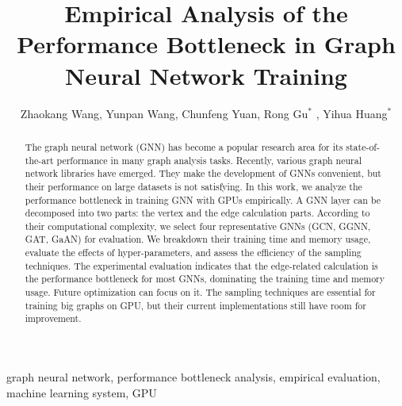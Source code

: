 \documentclass{elsarticle}
\begin{document}
\begin{frontmatter}

	\title{Empirical Analysis of the Performance Bottleneck in Graph Neural Network Training}
    \author{Zhaokang Wang, Yunpan Wang, Chunfeng Yuan, Rong Gu$^*$ , Yihua Huang$^*$ }
	\address{State Key Laboratory for Novel Software Technology, \\Department of Computer Science and Technology, Nanjing University, \\Nanjing 210023, China}

	\begin{abstract}
		The graph neural network (GNN) has become a popular research area for its state-of-the-art performance in many graph analysis tasks.
		Recently, various graph neural network libraries have emerged.
		They make the development of GNNs convenient, but their performance on large datasets is not satisfying.
		In this work, we analyze the performance bottleneck in training GNN with GPUs empirically.
		A GNN layer can be decomposed into two parts: the vertex and the edge calculation parts.
		According to their computational complexity, we select four representative GNNs (GCN, GGNN, GAT, GaAN) for evaluation.
		We breakdown their training time and memory usage, evaluate the effects of hyper-parameters, and assess the efficiency of the sampling techniques.  
		The experimental evaluation indicates that the edge-related calculation is the performance bottleneck for most GNNs, dominating the training time and memory usage.
		Future optimization can focus on it. 
		The sampling techniques are essential for training big graphs on GPU, but their current implementations still have room for improvement.
	\end{abstract}

	\begin{keyword}
		graph neural network, performance bottleneck analysis, empirical evaluation, machine learning system, GPU
	\end{keyword}

\end{frontmatter}

\linenumbers









\nocite{*}%

\end{document}
